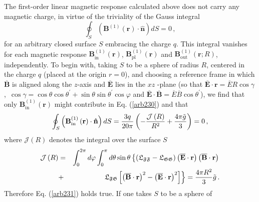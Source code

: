 \documentclass[12pt]{article}
\begin{document}
The first-order linear magnetic response calculated above does not carry any
magnetic charge, in virtue of the triviality of the Gauss integral%
\begin{equation}
\oint_{S}\left( \mathbf{B}^{\left( 1\right) }\left( \mathbf{r}\right) \cdot 
\mathbf{\hat{n}}\right) dS=0\,,  \label{arb230}
\end{equation}%
for an arbitrary closed surface $S$ embracing the charge $q$. This integral
vanishes for each magnetic response $\mathbf{B}_{\mathrm{in}}^{\left(
1\right) }\left( \mathbf{r}\right) $, $\mathbf{B}_{\mathrm{pl}}^{\left(
1\right) }\left( \mathbf{r}\right) $ and $\mathbf{B}_{\mathrm{out}}^{\left(
1\right) }\left( \mathbf{r};R\right) $, independently. To begin with, taking 
$S$ to be a sphere of radius $R$, centered in the charge $q$ (placed at the
origin $r=0$), and choosing a reference frame in which $\overline{\mathbf{B}}
$ is aligned along the $z$-axis and $\overline{\mathbf{E}}$ lies in the $xz$%
-plane (so that $\overline{\mathbf{E}}\cdot \mathbf{r}=\overline{E}R\cos
\gamma $\thinspace ,\ $\cos \gamma =\cos \theta \cos \theta ^{\prime }+\sin
\theta \sin \theta ^{\prime }\cos \varphi $ and $\overline{\mathbf{E}}\cdot 
\overline{\mathbf{B}}=\overline{E}\overline{B}\cos \theta ^{\prime }$), we
find that only $\mathbf{B}_{\mathrm{in}}^{\left( 1\right) }\left( \mathbf{r}%
\right) $ might contribute in Eq. (\ref{arb230}) and that%
\begin{equation}
\oint_{S}\left( \mathbf{B}_{\mathrm{in}}^{\left( 1\right) }\left( \mathbf{r}%
\right) \cdot \mathbf{\hat{n}}\right) dS=\frac{3q}{20\pi }\left( -\frac{%
\mathcal{J}\left( R\right) }{R^{2}}+\frac{4\pi \tilde{g}}{3}\right) =0\,,
\label{arb231}
\end{equation}%
where $\mathcal{J}\left( R\right) $ denotes the integral over the surface $S$%
\begin{eqnarray}
\mathcal{J}\left( R\right) &=&\int_{0}^{2\pi }d\varphi \int_{0}^{\pi
}d\theta \sin \theta \left\{ \left( \mathfrak{L}_{\mathfrak{FF}}-\mathfrak{L}%
_{\mathfrak{GG}}\right) \left( \overline{\mathbf{E}}\cdot \mathbf{r}\right)
\left( \mathbf{\overline{B}}\cdot \mathbf{r}\right) \right.  \notag \\
&+&\left. \mathfrak{L}_{\mathfrak{FG}}\left[ \left( \mathbf{\overline{B}}%
\cdot \mathbf{r}\right) ^{2}-\left( \overline{\mathbf{E}}\cdot \mathbf{r}%
\right) ^{2}\right] \right\} =\frac{4\pi R^{2}}{3}\tilde{g}\,.  \label{iden}
\end{eqnarray}%
Therefore Eq. (\ref{arb231}) holds true. If one takes $S$ to be a sphere of
\end{document}
